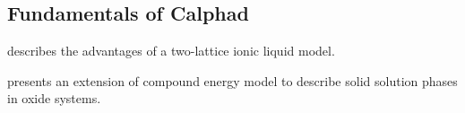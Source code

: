 \subsection{Fundamentals of Calphad}

\textcite{Hallstedt1994} describes the advantages of a two-lattice ionic liquid model.

\textcite{Barry1992} presents an extension of compound energy model to describe solid solution phases in oxide systems.

\endinput